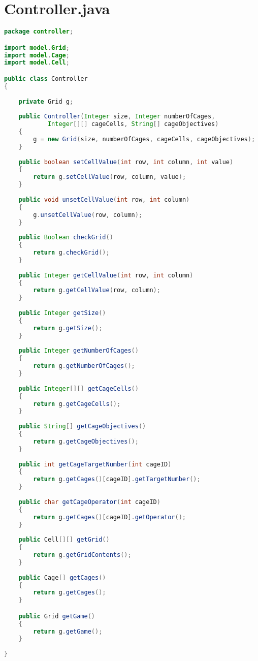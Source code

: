 \section{Controller.java}
\label{sec:kodeprogramcontroller}

\begin{lstlisting}[language=Java,basicstyle=\tiny,caption=Controller.java]
package controller;

import model.Grid;
import model.Cage;
import model.Cell;

public class Controller
{
    
    private Grid g;
    
    public Controller(Integer size, Integer numberOfCages, 
            Integer[][] cageCells, String[] cageObjectives)
    {
        g = new Grid(size, numberOfCages, cageCells, cageObjectives);
    }
    
    public boolean setCellValue(int row, int column, int value)
    {
        return g.setCellValue(row, column, value);
    }
    
    public void unsetCellValue(int row, int column)
    {
        g.unsetCellValue(row, column);
    }
    
    public Boolean checkGrid()
    {
        return g.checkGrid();
    }
    
    public Integer getCellValue(int row, int column)
    {
        return g.getCellValue(row, column);
    }
    
    public Integer getSize()
    {
        return g.getSize();
    }
    
    public Integer getNumberOfCages()
    {
        return g.getNumberOfCages();
    }
    
    public Integer[][] getCageCells()
    {
        return g.getCageCells();
    } 
    
    public String[] getCageObjectives()
    {
        return g.getCageObjectives();
    }
    
    public int getCageTargetNumber(int cageID)
    {
        return g.getCages()[cageID].getTargetNumber();
    }
    
    public char getCageOperator(int cageID)
    {
        return g.getCages()[cageID].getOperator();
    }
    
    public Cell[][] getGrid()
    {
        return g.getGridContents();
    }
    
    public Cage[] getCages()
    {
        return g.getCages();
    }

    public Grid getGame()
    {
        return g.getGame();
    }
    
}
\end{lstlisting}

